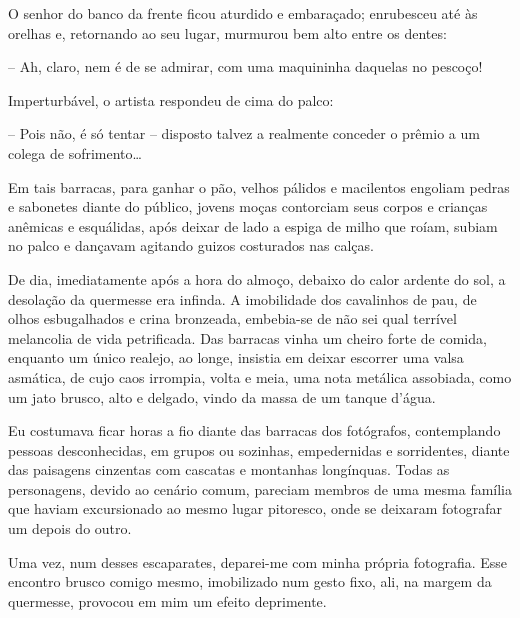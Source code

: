 O senhor do banco da frente ficou aturdido e embaraçado; enrubesceu até às orelhas e, retornando ao seu lugar, murmurou bem alto entre os dentes: 

-- Ah, claro, nem é de se admirar, com uma maquininha daquelas no pescoço!

Imperturbável, o artista respondeu de cima do palco:

-- Pois não, é só tentar -- disposto talvez a realmente conceder o prêmio a um colega de sofrimento\dots

Em tais barracas, para ganhar o pão, velhos pálidos e macilentos engoliam pedras e sabonetes diante do público, jovens moças contorciam seus corpos e crianças anêmicas e esquálidas, após deixar de lado a espiga de milho que roíam, subiam no palco e dançavam agitando guizos costurados nas calças.

De dia, imediatamente após a hora do almoço, debaixo do calor ardente do sol, a desolação da quermesse era infinda. A imobilidade dos cavalinhos de pau, de olhos esbugalhados e crina bronzeada, embebia-se de não sei qual terrível melancolia de vida petrificada. Das barracas vinha um cheiro forte de comida, enquanto um único realejo, ao longe, insistia em deixar escorrer uma valsa asmática, de cujo caos irrompia, volta e meia, uma nota metálica assobiada, como um jato brusco, alto e delgado, vindo da massa de um tanque d’água.

Eu costumava ficar horas a fio diante das barracas dos fotógrafos, contemplando pessoas desconhecidas, em grupos ou sozinhas, empedernidas e sorridentes, diante das paisagens cinzentas com cascatas e montanhas longínquas. Todas as personagens, devido ao cenário comum, pareciam membros de uma mesma família que haviam excursionado ao mesmo lugar pitoresco, onde se deixaram fotografar um depois do outro.

Uma vez, num desses escaparates, deparei-me com minha própria fotografia. Esse encontro brusco comigo mesmo, imobilizado num gesto fixo, ali, na margem da quermesse, provocou em mim um efeito deprimente.

